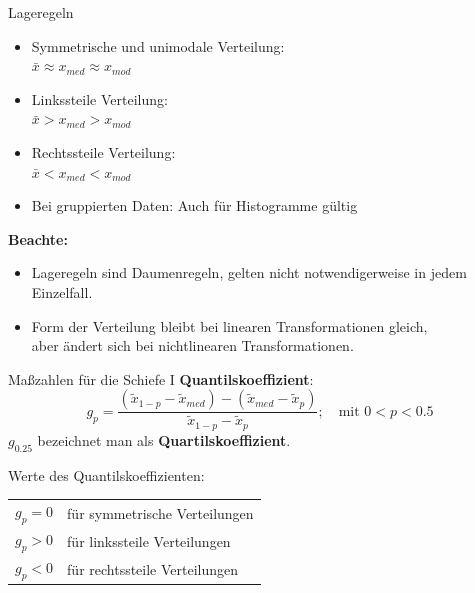 \documentclass[
  10pt,
  ignorenonframetext,
]{beamer}
\providecommand{\tightlist}{%
  \setlength{\itemsep}{0pt}\setlength{\parskip}{0pt}}
\begin{document}
\begin{frame}{Lageregeln}
\protect\hypertarget{lageregeln}{}
\begin{itemize}
\tightlist
\item
  Symmetrische und unimodale Verteilung:\\
  \(\bar{x} \approx x_{med} \approx x_{mod}\)
\item
  Linkssteile Verteilung:\\
  \(\bar{x} > x_{med} > x_{mod}\)
\item
  Rechtssteile Verteilung:\\
  \(\bar{x} < x_{med} < x_{mod}\)
\item
  Bei gruppierten Daten: Auch für Histogramme gültig
\end{itemize}

\textbf{Beachte:}

\begin{itemize}
\tightlist
\item
  Lageregeln sind Daumenregeln, gelten nicht notwendigerweise in jedem
  Einzelfall.
\item
  Form der Verteilung bleibt bei linearen Transformationen gleich,\\
  aber ändert sich bei nichtlinearen Transformationen.
\end{itemize}
\end{frame}

\begin{frame}{Maßzahlen für die Schiefe I}
\protect\hypertarget{mauxdfzahlen-fuxfcr-die-schiefe-i}{}
\textbf{Quantilskoeffizient}: \begin{equation*}
    g_p = \frac{(\tilde x_{1-p} - \tilde x_{med}) - (\tilde x_{med} - \tilde x_p)}{\tilde x_{1-p} - \tilde x_p}; \quad \text{mit } 0 < p < 0.5
\end{equation*} \(g_{0.25}\) bezeichnet man als
\textbf{Quartilskoeffizient}.

Werte des Quantilskoeffizienten:

\begin{tabular}{ll}
      $g_p = 0$ & für symmetrische Verteilungen \\
      $g_p > 0$ & für linkssteile Verteilungen \\
      $g_p < 0$ & für rechtssteile Verteilungen \\
\end{tabular}
\end{frame}
\end{document}

